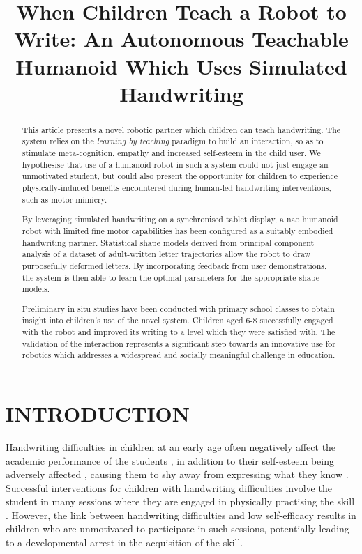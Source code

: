 \documentclass{sig-alternate}
\title{\LARGE \bf
When Children Teach a Robot to Write: An Autonomous Teachable Humanoid Which Uses Simulated Handwriting
}
\begin{document}
\maketitle

\begin{abstract}

This article presents a novel robotic partner which children can teach
handwriting.  The system relies on the \emph{learning by teaching} paradigm to
build an interaction, so as to stimulate meta-cognition, empathy and
increased self-esteem in the child user.  We hypothesise that use of a
humanoid robot in such a system could not just engage an unmotivated student,
but could also present the opportunity for children to experience
physically-induced benefits encountered during human-led handwriting
interventions, such as motor mimicry.

By leveraging simulated handwriting on a synchronised tablet display, a {\sc
nao} humanoid robot with limited fine motor capabilities has been configured as
a suitably embodied handwriting partner. Statistical shape models derived from
principal component analysis of a dataset of adult-written letter trajectories
allow the robot to draw purposefully deformed letters. By incorporating feedback
from user demonstrations, the system is then able to learn the optimal
parameters for the appropriate shape models. 

Preliminary in situ studies have been conducted with primary school classes to
obtain insight into children's use of the novel system.  Children aged 6-8
successfully engaged with the robot and improved its writing to a level which
they were satisfied with. The validation of the interaction represents a
significant step towards an innovative use for robotics which addresses a
widespread and socially meaningful challenge in education. 

\end{abstract}


\section{INTRODUCTION}

Handwriting difficulties in children at an early age often negatively affect
the academic performance of the students \cite{Christensen2005}, in addition to
their self-esteem being adversely affected \cite{Malloy1995}, causing them to
shy away from expressing what they know \cite{Medwell2008}.
Successful interventions for children with handwriting difficulties involve the
student in many sessions where they are engaged in physically practising the
skill \cite{Hoy2011}. However, the link between handwriting difficulties and low
self-efficacy \cite{Engel-Yeger2009} results in children who are unmotivated to
participate in such sessions, potentially leading to a developmental arrest in
the acquisition of the skill. 
\end{document}
